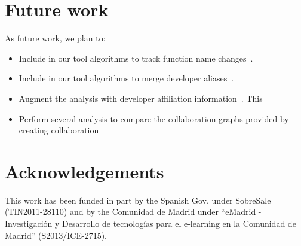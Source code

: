 \documentclass[a4paper]{article}
\begin{document}
\section{Future work}

As future work, we plan to:

\begin{itemize}
  \item Include in our tool algorithms to track function name changes~\cite{godfrey2005using}.
  \item Include in our tool algorithms to merge developer aliases~\cite{kouters2012s}.
  \item Augment the analysis with developer affiliation information~\cite{gonzalez2013understanding}. This 
  \item Perform several analysis to compare the collaboration graphs provided by 
  creating collaboration
\end{itemize}

\section*{Acknowledgements}

This work has been funded in part by the Spanish Gov. under SobreSale (TIN2011-28110) and by the Comunidad de Madrid under ``eMadrid - Investigaci\'on y Desarrollo de tecnolog\'ias para el e-learning en la Comunidad de Madrid'' (S2013/ICE-2715).

 


%
%
%
\end{document}
